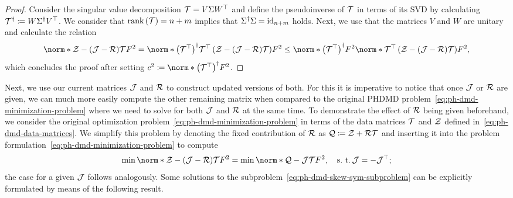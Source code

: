 \begin{proof}
    Consider the singular value decomposition $\mcl{T} = V \Sigma W\trans$ and define the pseudoinverse of $\mcl{T}$ in terms of its SVD by calculating $\mcl{T}^\dagger \coloneqq W \Sigma^\dagger V\trans$.
    We consider that $\rank{\mcl{T}} = n + m$ implies that $\Sigma^\dagger \Sigma = \id[n + m]$ holds.
    Next, we use that the matrices $V$ and $W$ are unitary and calculate the relation
    \begin{equation*}
        \norm*{\mcl{Z} - ( \mcl{J} - \mcl{R}) \mcl{T}}{F}^2 = \norm*{{\left( \mcl{T}\trans \right)}^\dagger \mcl{T}\trans \left( \mcl{Z} - ( \mcl{J} - \mcl{R}) \mcl{T} \right)}{F}^2 \leq \norm*{{\left( \mcl{T}\trans \right)}^\dagger}{F}^2 \norm*{\mcl{T}\trans \left( \mcl{Z} - ( \mcl{J} - \mcl{R}) \mcl{T} \right)}{F}^2,
    \end{equation*}
    which concludes the proof after setting $c^2 \coloneqq \norm*{{\left( \mcl{T}\trans \right)}^\dagger}{F}^2$.
\end{proof}

Next, we use our current matrices $\mcl{J}$ and $\mcl{R}$ to construct updated versions of both.
For this it is imperative to notice that once $\mcl{J}$ or $\mcl{R}$ are given, we can much more easily compute the other remaining matrix when compared to the original \ac{PHDMD} problem~\eqref{eq:ph-dmd-minimization-problem} where we need to solve for both $\mcl{J}$ and $\mcl{R}$ at the same time.
To demonstrate the effect of $\mcl{R}$ being given beforehand, we consider the original optimization problem~\eqref{eq:ph-dmd-minimization-problem} in terms of the data matrices $\mcl{T}$ and $\mcl{Z}$ defined in~\eqref{eq:ph-dmd-data-matrices}.
We simplify this problem by denoting the fixed contribution of $\mcl{R}$ as $\mcl{Q} \coloneqq \mcl{Z} + \mcl{R} \mcl{T}$ and inserting it into the problem formulation~\eqref{eq:ph-dmd-minimization-problem} to compute
\begin{equation}\label{eq:ph-dmd-skew-sym-subproblem}
    \min \norm*{\mcl{Z} - (\mcl{J} - \mcl{R}) \mcl{T}}{F}^2 = \min \norm*{\mcl{Q} - \mcl{J} \mcl{T}}{F}^2,\quad \suchthat \mcl{J} = - \mcl{J}\trans;
\end{equation}
the case for a given $\mcl{J}$ follows analogously.
Some solutions to the subproblem~\eqref{eq:ph-dmd-skew-sym-subproblem} can be explicitly formulated by means of the following result.

